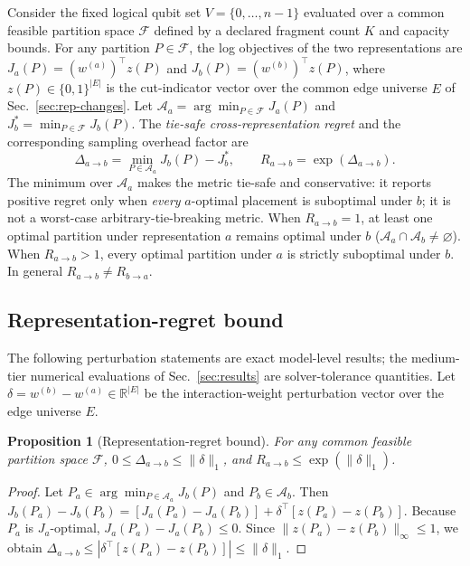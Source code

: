 \documentclass[
  aps,
  pra,
  reprint,
  amsmath,
  amssymb,
  longbibliography,
  nofootinbib,
  floatfix
]{revtex4-2}
\theoremstyle{plain}
\newtheorem{proposition}{Proposition}
\begin{document}
Consider the fixed logical qubit set $V=\{0,\ldots,n{-}1\}$ evaluated over a common feasible partition space $\mathcal{F}$ defined by a declared fragment count $K$ and capacity bounds. For any partition $P\in\mathcal{F}$, the log objectives of the two representations are $J_a(P)=(w^{(a)})^\top z(P)$ and $J_b(P)=(w^{(b)})^\top z(P)$, where $z(P)\in\{0,1\}^{|E|}$ is the cut-indicator vector over the common edge universe $E$ of Sec.~\ref{sec:rep-changes}. Let $\mathcal{A}_a=\arg\min_{P\in\mathcal{F}}J_a(P)$ and $J_b^*=\min_{P\in\mathcal{F}}J_b(P)$. The \emph{tie-safe cross-representation regret} and the corresponding sampling overhead factor are
\begin{equation}
  \Delta_{a\to b} = \min_{P \in \mathcal{A}_a} J_b(P) - J_b^*, \qquad R_{a\to b} = \exp(\Delta_{a\to b}).
  \label{eq:regret}
\end{equation}
The minimum over $\mathcal{A}_a$ makes the metric tie-safe and conservative: it reports positive regret only when \emph{every} $a$-optimal placement is suboptimal under $b$; it is not a worst-case arbitrary-tie-breaking metric. When $R_{a\to b}=1$, at least one optimal partition under representation $a$ remains optimal under $b$ ($\mathcal{A}_a\cap\mathcal{A}_b\neq\varnothing$). When $R_{a\to b}>1$, every optimal partition under $a$ is strictly suboptimal under $b$. In general $R_{a\to b}\neq R_{b\to a}$.

\subsection{Representation-regret bound}

The following perturbation statements are exact model-level results; the medium-tier numerical evaluations of Sec.~\ref{sec:results} are solver-tolerance quantities. Let $\delta=w^{(b)}-w^{(a)}\in\mathbb{R}^{|E|}$ be the interaction-weight perturbation vector over the edge universe $E$.

\begin{proposition}[Representation-regret bound]\label{prop:regret-bound}
For any common feasible partition space $\mathcal{F}$, $0\le\Delta_{a\to b}\le\|\delta\|_1$, and $R_{a\to b}\le\exp(\|\delta\|_1)$.
\end{proposition}
\begin{proof}
Let $P_a\in\arg\min_{P\in\mathcal{A}_a}J_b(P)$ and $P_b\in\mathcal{A}_b$. Then $J_b(P_a)-J_b(P_b)=[J_a(P_a)-J_a(P_b)]+\delta^\top[z(P_a)-z(P_b)]$. Because $P_a$ is $J_a$-optimal, $J_a(P_a)-J_a(P_b)\le0$. Since $\|z(P_a)-z(P_b)\|_\infty\le1$, we obtain $\Delta_{a\to b}\le|\delta^\top[z(P_a)-z(P_b)]|\le\|\delta\|_1$.
\end{proof}
\end{document}
